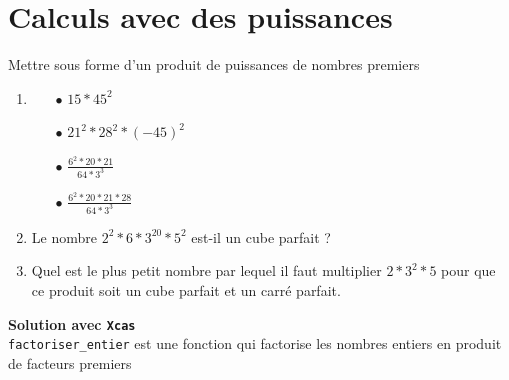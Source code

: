 \documentclass[a4paper,11pt]{book}
\begin{document}
\section{Calculs avec des puissances}
Mettre sous forme d'un produit de puissances de nombres premiers
\begin{enumerate}
\item 
\begin{itemize}
\item[$\bullet$]
$15*45^2$
\item[$\bullet$]
$21^2*28^2*(-45)^2$
\item[$\bullet$] $\displaystyle \frac{6^2*20*21}{64*3^3}$
\item[$\bullet$] $\displaystyle \frac{6^2*20*21*28}{64*3^3}$
\end{itemize}
\item
Le nombre $2^2*6*3^{20}*5^2$ est-il un cube parfait ?
\item Quel est le plus petit nombre par lequel il faut multiplier 
$2*3^2*5$ pour 
que ce produit soit un cube parfait et un carr\'e parfait. 
\end{enumerate}
{\bf Solution avec {\tt Xcas}}\\
{\tt factoriser\_entier} est une fonction qui factorise les nombres entiers en produit de 
facteurs premiers
\end{document}
